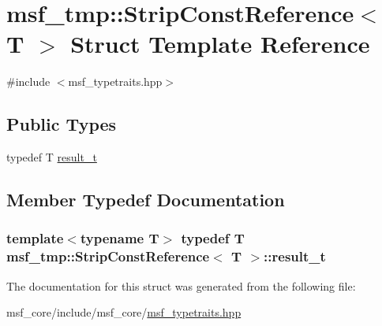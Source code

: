 \hypertarget{structmsf__tmp_1_1StripConstReference}{\section{msf\-\_\-tmp\-:\-:Strip\-Const\-Reference$<$ T $>$ Struct Template Reference}
\label{structmsf__tmp_1_1StripConstReference}
}


{\ttfamily \#include $<$msf\-\_\-typetraits.\-hpp$>$}

\subsection*{Public Types}
\begin{DoxyCompactItemize}
\item 
typedef T \hyperlink{structmsf__tmp_1_1StripConstReference_a4069e12bbcefd7f81f4596cee921b0df}{result\-\_\-t}
\end{DoxyCompactItemize}


\subsection{Member Typedef Documentation}
\hypertarget{structmsf__tmp_1_1StripConstReference_a4069e12bbcefd7f81f4596cee921b0df}{
\subsubsection[{result\-\_\-t}]{\setlength{\rightskip}{0pt plus 5cm}template$<$typename T$>$ typedef T {\bf msf\-\_\-tmp\-::\-Strip\-Const\-Reference}$<$ T $>$\-::{\bf result\-\_\-t}}}\label{structmsf__tmp_1_1StripConstReference_a4069e12bbcefd7f81f4596cee921b0df}


The documentation for this struct was generated from the following file\-:\begin{DoxyCompactItemize}
\item 
msf\-\_\-core/include/msf\-\_\-core/\hyperlink{msf__typetraits_8hpp}{msf\-\_\-typetraits.\-hpp}\end{DoxyCompactItemize}

